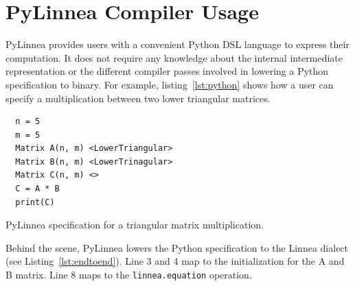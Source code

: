 \documentclass[conference]{IEEEtran}
\begin{document}
\section{PyLinnea Compiler Usage}

PyLinnea provides users with a convenient Python DSL language to express their
computation. It does not require any knowledge about the internal intermediate
representation or the different compiler passes involved in lowering a Python
specification to binary. For example, listing~\ref{lst:python} shows how a user
can specify a multiplication between two lower triangular matrices. 

\begin{listing}[]
\begin{center}
\begin{minipage}[]{0.5\textwidth}
\begin{verbatim}
  n = 5
  m = 5
  Matrix A(n, m) <LowerTriangular>
  Matrix B(n, m) <LowerTrinagular>
  Matrix C(n, m) <>
  C = A * B
  print(C)
\end{verbatim}
\end{minipage}
  \caption{PyLinnea specification for a triangular matrix multiplication.}
\label{lst:python}
\end{center}
\end{listing}

Behind the scene, PyLinnea lowers the Python specification to the Linnea
dialect (see Listing~\ref{lst:endtoend}).  Line 3 and 4 map to the
initialization for the A and B matrix. Line 8 maps to
the \texttt{linnea.equation} operation. 
\end{document}
